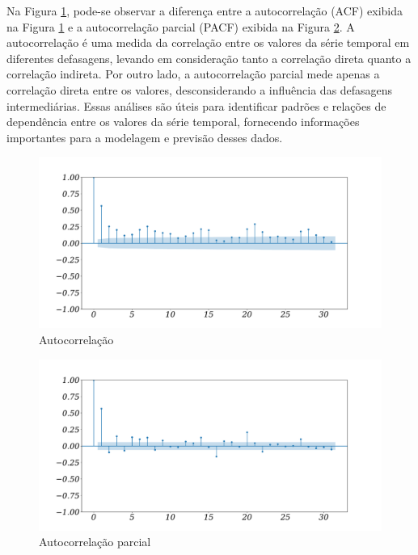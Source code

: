Na Figura \ref{fig:acfa}, pode-se observar a diferença entre a autocorrelação (ACF) exibida na Figura \ref{fig:acfa} e a autocorrelação parcial (PACF) exibida na Figura \ref{fig:pacf}. A autocorrelação é uma medida da correlação entre os valores da série temporal em diferentes defasagens, levando em consideração tanto a correlação direta quanto a correlação indireta. Por outro lado, a autocorrelação parcial mede apenas a correlação direta entre os valores, desconsiderando a influência das defasagens intermediárias. Essas análises são úteis para identificar padrões e relações de dependência entre os valores da série temporal, fornecendo informações importantes para a modelagem e previsão desses dados.

\begin{figure}[H]
	\centering
	\caption{Autocorrelação}\label{fig:acfa}
	\includegraphics[width=0.9\linewidth]{Resultados/Figuras/acf} 
	

\end{figure}

	
	

\begin{figure}[H]
	\centering
	\caption{Autocorrelação parcial}\label{fig:pacf}
	\includegraphics[width=0.9\linewidth]{Resultados/Figuras/pacf}
		
		

\end{figure}

